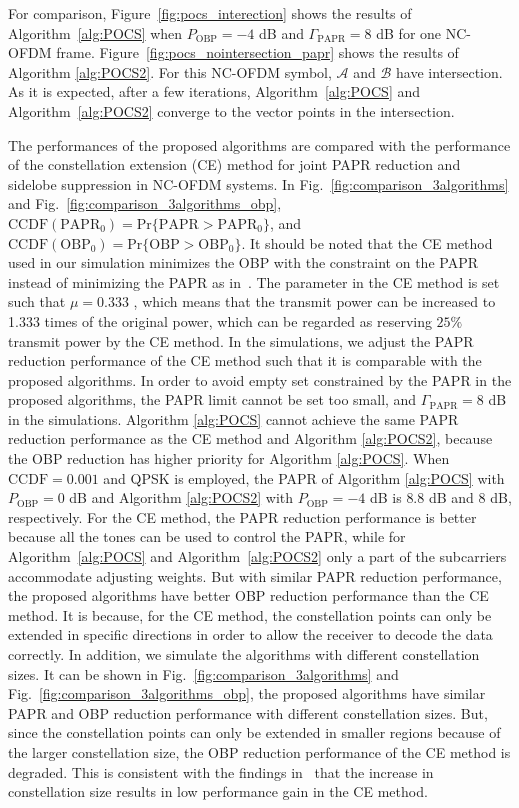 \documentclass[paper]{ieice}
\begin{document}
For comparison, Figure~\ref{fig:pocs_interection} shows the results of Algorithm~\ref{alg:POCS} when $P_{\mathrm{OBP}} =  -4$ dB and $\Gamma_{\mathrm{PAPR}} =  8$ dB for one NC-OFDM frame. Figure~\ref{fig:pocs_nointersection_papr} shows the results of Algorithm \ref{alg:POCS2}. For this NC-OFDM symbol, $\mathcal{A}$ and $\mathcal{B}$ have intersection.  As it is expected, after a few iterations, Algorithm~\ref{alg:POCS} and Algorithm~\ref{alg:POCS2} converge to the vector points in the intersection.  


The performances of the proposed algorithms are compared with the performance of the constellation extension (CE) method for joint PAPR reduction and sidelobe suppression in NC-OFDM systems. In Fig.~\ref{fig:comparison_3algorithms} and Fig.~\ref{fig:comparison_3algorithms_obp}, $\mathrm{CCDF}(\mathrm{PAPR}_{0}) = \mathrm{Pr}\{\mathrm{PAPR} > \mathrm{PAPR}_{0}\}$, and $\mathrm{CCDF}( \mathrm{OBP}_{0}) = \mathrm{Pr}\{\mathrm{OBP} > \mathrm{OBP}_{0}\}$. It should be noted that the CE method used in our simulation minimizes the OBP with the constraint on the PAPR instead of minimizing the PAPR as in~\cite{ni2015joint}. The parameter in the CE method is set such that $\mu = 0.333$ , which means that the transmit power can be increased to 1.333 times of the original power, which can be regarded as reserving $25\%$ transmit power by the CE method. In the simulations, we adjust the PAPR reduction performance of the CE method such that it is comparable with the proposed algorithms. In order to avoid empty set constrained
by the PAPR in the proposed algorithms, the PAPR limit cannot be set too small, and $\Gamma_{\mathrm{PAPR}} = 8$ dB in the simulations. Algorithm \ref{alg:POCS} cannot achieve the same PAPR reduction performance as the CE method and Algorithm \ref{alg:POCS2}, because the OBP reduction has higher priority for Algorithm \ref{alg:POCS}. When
$\mathrm{CCDF} = 0.001$ and QPSK is employed, the PAPR of Algorithm \ref{alg:POCS} with $P_{\mathrm{OBP}} = 0$ dB and Algorithm \ref{alg:POCS2} with $P_{\mathrm{OBP}} = -4$ dB is $8.8$ dB and $8$ dB, respectively. For the CE method, the PAPR reduction performance is better because all the tones can be used to control the PAPR, while for Algorithm~\ref{alg:POCS} and Algorithm~\ref{alg:POCS2} only a part of the subcarriers accommodate adjusting weights. But with similar PAPR reduction performance, the proposed algorithms have better OBP reduction performance than the CE method. It is because, for the CE method, the constellation points can only be extended in specific directions in order to allow the receiver to decode the data correctly. In addition, we simulate the algorithms with different constellation sizes. It can be shown in Fig.~\ref{fig:comparison_3algorithms} and Fig.~\ref{fig:comparison_3algorithms_obp}, the proposed algorithms have similar PAPR and OBP reduction performance with different constellation sizes. But, since the constellation points can only be extended in smaller regions because of the larger constellation size, the OBP reduction performance of the CE method is degraded. This is consistent with the findings in~\cite{1202695} that the increase in constellation size results in low
performance gain in the CE method.
\end{document}
